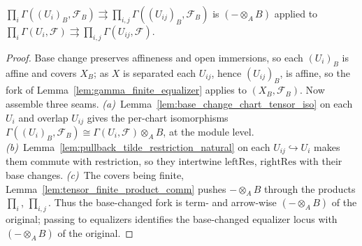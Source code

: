 \begin{lemma}
  \(\prod_i \Gamma((U_i)_B,\mathcal{F}_B) \rightrightarrows \prod_{i,j}
  \Gamma((U_{ij})_B,\mathcal{F}_B)\) is \((- \otimes_A B)\) applied to
  \(\prod_i \Gamma(U_i,\mathcal{F}) \rightrightarrows \prod_{i,j}
  \Gamma(U_{ij},\mathcal{F})\).
  \begin{proof}
    Base change preserves affineness and open immersions, so each \((U_i)_B\) is affine and
    covers \(X_B\); as \(X\) is separated each \(U_{ij}\), hence \((U_{ij})_B\), is affine, so
    the fork of Lemma~\ref{lem:gamma_finite_equalizer} applies to \((X_B,\mathcal{F}_B)\). Now
    assemble three seams. \emph{(a)}~Lemma~\ref{lem:base_change_chart_tensor_iso} on each
    \(U_i\) and overlap \(U_{ij}\) gives the per-chart isomorphisms
    \(\Gamma((U_i)_B,\mathcal{F}_B)\cong\Gamma(U_i,\mathcal{F})\otimes_A B\), at the module
    level. \emph{(b)}~Lemma~\ref{lem:pullback_tilde_restriction_natural} on each
    \(U_{ij}\hookrightarrow U_i\) makes them commute with restriction, so they intertwine
    \(\mathrm{leftRes}\), \(\mathrm{rightRes}\) with their base changes. \emph{(c)}~The covers
    being finite, Lemma~\ref{lem:tensor_finite_product_comm} pushes \(-\otimes_A B\) through
    the products \(\prod_i\), \(\prod_{i,j}\). Thus the base-changed fork is term- and
    arrow-wise \((-\otimes_A B)\) of the original; passing to equalizers identifies the
    base-changed equalizer locus with \((-\otimes_A B)\) of the original.
  \end{proof}
\end{lemma}

